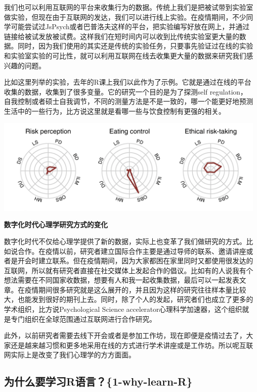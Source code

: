 \documentclass[
  oneside]{book}
\begin{document}
我们也可以利用互联网的平台来收集行为的数据。传统上我们是把被试带到实验室做实验，但现在由于互联网的发达，我们可以进行线上实验。在疫情期间，不少同学可能尝试过JsPsych或者巴普洛夫这样的平台，把实验编写好放在网上，并通过链接给被试发放被试费。这样我们在短时间内可以收到比传统实验室更大量的数据。同时，因为我们使用的其实还是传统的实验任务，只要事先验证过在线的实验和实验室实验的可比性，就可以利用互联网在线去收集更大量的数据来研究我们感兴趣的问题。

比如这里列举的实验，去年的R课上我们以此作为了示例。它就是通过在线的平台收集的数据，收集到了很多变量。它的研究一个目的是为了探测self regulation，自我控制或者硕士自我调节，不同的测量方法是不是一致的，哪一个能更好地预测生活中的一些行为，比方说这里就是看哪一些与饮食控制有更强的相关。

\includegraphics{1001-lesson1/image-20230302195303677.png}

\textbf{数字化时代心理学研究方式的变化}

数字化时代不仅给心理学提供了新的数据，实际上也变革了我们做研究的方式。比如说合作。在疫情以前，研究者建立国际合作主要是通过导师的联系、邀请讲座或者是开会时建立联系。但在疫情期间，因为大家都困在家里同时又都使用很发达的互联网，所以就有研究者直接在社交媒体上发起合作的倡议。比如有的人说我有个想法需要在不同国家收数据，想要有人和我一起收集数据，最后可以一起发表文章。在疫情期间很多研究就是这么展开的，并且因为这样的研究往往样本量比较大，也能发到很好的期刊上去。同时，除了个人的发起，研究者们也成立了更多的学术组织，比方说Psychological Science accelerator心理科学加速器，这个组织就是专门组织在全球范围通过互联网进行合作研究。

此外，以前研究者需要去线下开会或者是参加工作坊，现在即便是疫情过去了，大家还是越来越习惯和更多地采用在线的方式进行学术讲座或是工作坊。所以呢互联网实际上是改变了我们心理学的方方面面。

\hypertarget{ux4e3aux4ec0ux4e48ux8981ux5b66ux4e60rux8bedux8a001-why-learn-r}{%
\subsection{为什么要学习R语言？\{1-why-learn-R\}}\label{ux4e3aux4ec0ux4e48ux8981ux5b66ux4e60rux8bedux8a001-why-learn-r}}
\end{document}
